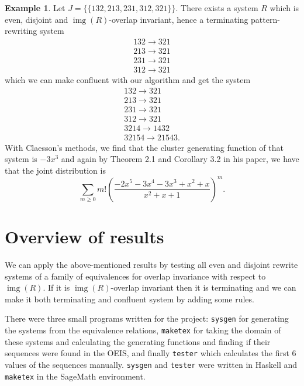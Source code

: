 \documentclass[a4paper, 11pt, english]{article}
\newcommand{\patternrule}{ \to \!}
\theoremstyle{definition}
\newtheorem{example}[theorem]{Example}
\DeclareMathOperator{\img}{img}
\begin{document}
\begin{example}

Let $J = \{ \{ 132, 213, 231, 312, 321 \} \}$. There exists a system $R$ which is even,
disjoint and $\img(R)$-overlap invariant, hence a terminating pattern-rewriting system
\[
    \begin{matrix}
      132 \patternrule 321 \\
      213 \patternrule 321 \\
      231 \patternrule 321 \\
      312 \patternrule 321
    \end{matrix}
\]
which we can make confluent with our algorithm and get the system
\[
    \begin{matrix}
      132 \patternrule 321 \\
      213 \patternrule 321 \\
      231 \patternrule 321 \\
      312 \patternrule 321 \\
      3214 \patternrule 1432 \\
      32154 \patternrule 21543.
    \end{matrix}
\]
With Claesson's methods, we find that the cluster generating function of that system is $-3x^3$ and
again by Theorem 2.1 and Corollary 3.2 in his paper, we have that the joint distribution is
\[
  \sum_{m \geq 0} m! (\frac{-2x^5-3x^4-3x^3+x^2+x}{x^2+x+1})^m.
\]

\end{example}

\section{Overview of results}
We can apply the above-mentioned results by testing all even and disjoint rewrite systems of a
family of equivalences for overlap invariance with respect to $\img(R)$. If it is $\img(R)$-overlap invariant
then it is terminating and we can make it both terminating and confluent system by adding some rules.

There were three small programs \cite{hartjenstein:2021} written for the project: \verb|sysgen| for generating the
systems from the equivalence relations, \verb|maketex| for taking the domain of these
systems and calculating the generating functions and finding if their sequences
were found in the OEIS, and finally \verb|tester| which calculates the first 6 values
of the sequences manually. \verb|sysgen| and \verb|tester| were written in Haskell and
\verb|maketex| in the SageMath environment. 
\end{document}
